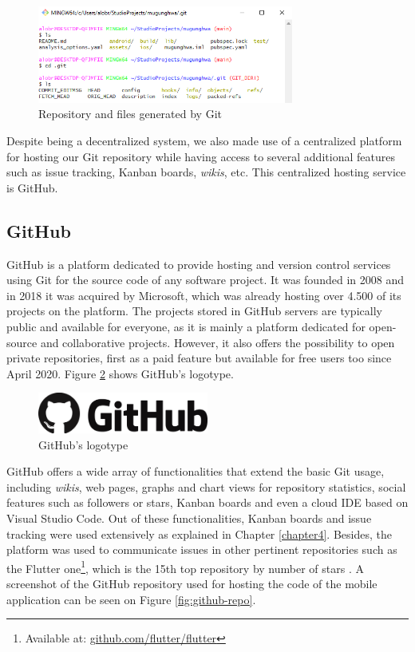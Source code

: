 \begin{figure}[h]
  \centering
  \includegraphics[width=0.75\textwidth]{Figures/git-repo.png}
  \caption{%
    Repository and files generated by Git
  }
  \label{fig:git-repo}
\end{figure}

Despite being a decentralized system, we also made use of a centralized platform for hosting our Git repository while having access to several additional features such as issue tracking, Kanban boards, \textit{wikis}, etc. This centralized hosting service is GitHub.

\subsection{GitHub}

GitHub \cite{noauthor_githubcom_2021} is a platform dedicated to provide hosting and version control services using Git for the source code of any software project. It was founded in 2008 and in 2018 it was acquired by Microsoft, which was already hosting over 4.500 of its projects on the platform. The projects stored in GitHub servers are typically public and available for everyone, as it is mainly a platform dedicated for open-source and collaborative projects. However, it also offers the possibility to open private repositories, first as a paid feature but available for free users too since April 2020. Figure \ref{fig:github-logo} shows GitHub's logotype.

\begin{figure}[h]
  \centering
  \includegraphics[width=0.5\textwidth]{Figures/github-logo.png}
  \caption{%
    GitHub's logotype
  }
  \label{fig:github-logo}
\end{figure}

GitHub offers a wide array of functionalities that extend the basic Git usage, including \textit{wikis}, web pages, graphs and chart views for repository statistics, social features such as followers or stars, Kanban boards and even a cloud IDE based on Visual Studio Code. Out of these functionalities, Kanban boards and issue tracking were used extensively as explained in Chapter \ref{chapter4}. Besides, the platform was used to communicate issues in other pertinent repositories such as the Flutter one\footnote{Available at: \url{github.com/flutter/flutter}}, which is the 15th top repository by number of stars \cite{noauthor_repositories_nodate}. A screenshot of the GitHub repository used for hosting the code of the mobile application can be seen on Figure \ref{fig:github-repo}.

